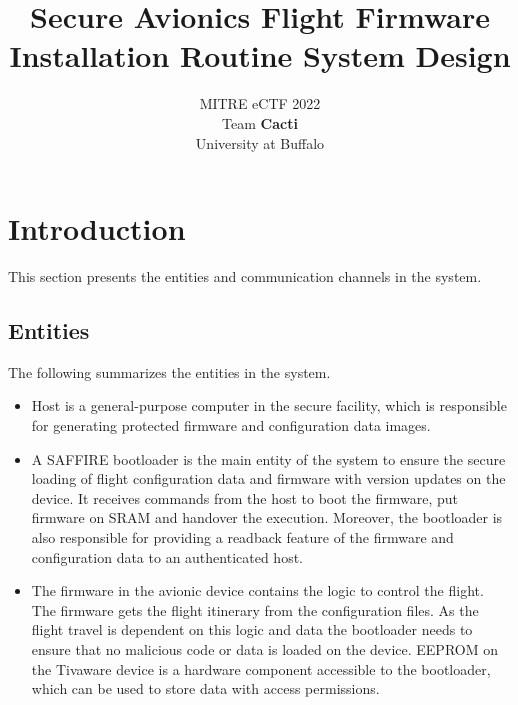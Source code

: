 \documentclass[11pt,oneside,onecolumn,letterpaper]{article}
\title{Secure Avionics Flight Firmware Installation Routine System Design}
\author{MITRE eCTF 2022\\Team \textbf{Cacti}\\ University at Buffalo}
\date{}
\newcommand{\ziming}[1]{%
  \begingroup
  \definecolor{hlcolor}{RGB}{20, 255, 20}\sethlcolor{hlcolor}%
  \textcolor{black}{\hl{\textit{\textbf{Ziming:} #1}}}%
  \endgroup
}
\begin{document}
\normalsize


\maketitle

\renewcommand{\thepage}{System Design, Team Cacti, University at Buffalo--\arabic{page}}
\setcounter{page}{1} \normalsize
%

\newcommand{\flagRollback}{\textsf{Rollback}\xspace}

\section{Introduction}

This section presents the entities and communication channels in the system.

\subsection{Entities}

The following summarizes the entities in the system.

\begin{itemize}
  \item Host is a general-purpose computer in the secure facility, which is responsible for generating protected firmware and configuration data images.
	\item A SAFFIRE bootloader is the main entity of the system to ensure the secure loading of flight configuration data and firmware with version updates on the device.
	It receives commands from the host to boot the firmware, put firmware on SRAM and handover the execution. 
	Moreover, the bootloader is also responsible for providing a readback feature of the firmware and configuration data to an authenticated host.
	\item The firmware in the avionic device contains the logic to control the flight. 
	The firmware gets the flight itinerary from the configuration files.
	As the flight travel is dependent on this logic and data the bootloader needs to ensure that no malicious code or data is loaded on the device.
  	EEPROM on the Tivaware device is a hardware component accessible to the bootloader, which can be used to store data with access permissions. %
\end{itemize}
\end{document}
